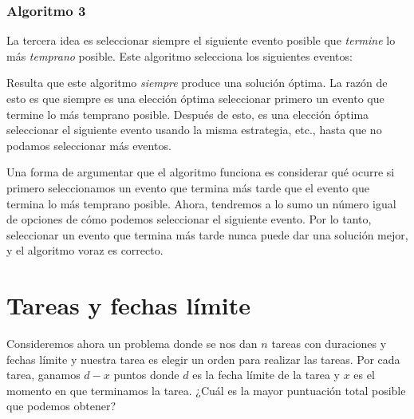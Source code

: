 \subsubsection*{Algoritmo 3}

La tercera idea es seleccionar siempre el siguiente
evento posible que \emph{termine} lo más \emph{temprano} posible.
Este algoritmo selecciona los siguientes eventos:
\begin{center}
\end{center}

Resulta que este algoritmo
\emph{siempre} produce una solución óptima.
La razón de esto es que siempre es una elección óptima
seleccionar primero un evento que termine
lo más temprano posible.
Después de esto, es una elección óptima
seleccionar el siguiente evento
usando la misma estrategia, etc.,
hasta que no podamos seleccionar más eventos.

Una forma de argumentar que el algoritmo funciona
es considerar
qué ocurre si primero seleccionamos un evento
que termina más tarde que el evento que termina
lo más temprano posible.
Ahora, tendremos a lo sumo un número igual de
opciones de cómo podemos seleccionar el siguiente evento.
Por lo tanto, seleccionar un evento que termina más tarde
nunca puede dar una solución mejor,
y el algoritmo voraz es correcto.

\section{Tareas y fechas límite}

Consideremos ahora un problema donde
se nos dan $n$ tareas con duraciones y fechas límite
y nuestra tarea es elegir un orden para realizar las tareas.
Por cada tarea, ganamos $d-x$ puntos
donde $d$ es la fecha límite de la tarea
y $x$ es el momento en que terminamos la tarea.
¿Cuál es la mayor puntuación total posible
que podemos obtener?

